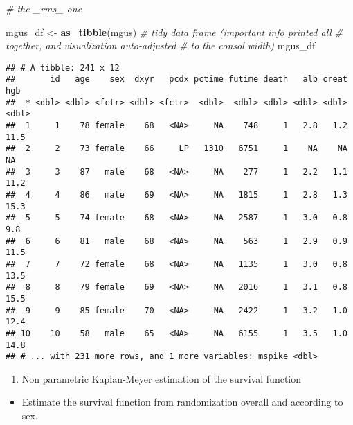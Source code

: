\documentclass[]{book}
\newenvironment{Shaded}{\begin{snugshade}}{\end{snugshade}}
\newcommand{\KeywordTok}[1]{\textcolor[rgb]{0.13,0.29,0.53}{\textbf{{#1}}}}
\newcommand{\StringTok}[1]{\textcolor[rgb]{0.31,0.60,0.02}{{#1}}}
\newcommand{\CommentTok}[1]{\textcolor[rgb]{0.56,0.35,0.01}{\textit{{#1}}}}
\newcommand{\NormalTok}[1]{{#1}}
\providecommand{\tightlist}{%
  \setlength{\itemsep}{0pt}\setlength{\parskip}{0pt}}
\theoremstyle{definition}
\theoremstyle{definition}
\theoremstyle{definition}
\theoremstyle{remark}
\begin{document}
\begin{Shaded}
\begin{Highlighting}[]
                 \CommentTok{# the _rms_ one}

\NormalTok{mgus_df <-}\StringTok{ }\KeywordTok{as_tibble}\NormalTok{(mgus)         }\CommentTok{# tidy data frame (important info printed all}
                                   \CommentTok{# together, and visualization auto-adjusted}
                                   \CommentTok{# to the consol width)}
\NormalTok{mgus_df}
\end{Highlighting}
\end{Shaded}

\begin{verbatim}
## # A tibble: 241 x 12
##       id   age    sex  dxyr   pcdx pctime futime death   alb creat   hgb
##  * <dbl> <dbl> <fctr> <dbl> <fctr>  <dbl>  <dbl> <dbl> <dbl> <dbl> <dbl>
##  1     1    78 female    68   <NA>     NA    748     1   2.8   1.2  11.5
##  2     2    73 female    66     LP   1310   6751     1    NA    NA    NA
##  3     3    87   male    68   <NA>     NA    277     1   2.2   1.1  11.2
##  4     4    86   male    69   <NA>     NA   1815     1   2.8   1.3  15.3
##  5     5    74 female    68   <NA>     NA   2587     1   3.0   0.8   9.8
##  6     6    81   male    68   <NA>     NA    563     1   2.9   0.9  11.5
##  7     7    72 female    68   <NA>     NA   1135     1   3.0   0.8  13.5
##  8     8    79 female    69   <NA>     NA   2016     1   3.1   0.8  15.5
##  9     9    85 female    70   <NA>     NA   2422     1   3.2   1.0  12.4
## 10    10    58   male    65   <NA>     NA   6155     1   3.5   1.0  14.8
## # ... with 231 more rows, and 1 more variables: mspike <dbl>
\end{verbatim}

\begin{enumerate}
\def\labelenumi{\arabic{enumi}.}
\setcounter{enumi}{1}
\tightlist
\item
  Non parametric Kaplan-Meyer estimation of the survival function
\end{enumerate}

\begin{itemize}
\tightlist
\item
  Estimate the survival function from randomization overall and
  according to sex.
\end{itemize}
\end{document}
